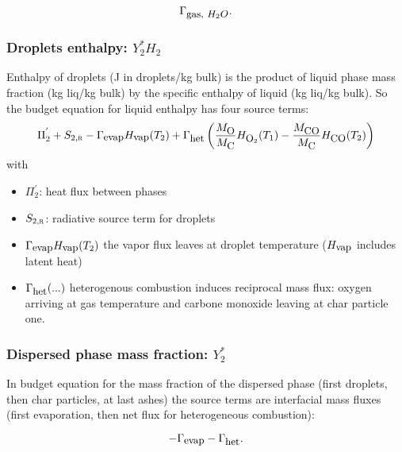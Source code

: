 \begin{equation}
   \Gamma_{\mbox{\small gas, $H_{2}O$}}.
\end{equation}                         

 



\subsubsection{Droplets enthalpy: $Y_{2}^{*}H_{2}$ }
 
Enthalpy of droplets (J in droplets/kg bulk) is the product of liquid phase mass
fraction (kg liq/kg bulk) by the specific enthalpy of liquid (kg liq/kg
bulk). So the budget equation for liquid enthalpy has four source terms:
\begin{equation}
     \Pi_{2}^{'}+S_{2,\mbox{\scriptsize\textsc{r}}}-\Gamma_{\mbox{\small evap}}H_{\mbox{\small vap}}(T_{2})
                        +\Gamma_{\mbox{\small het}}\left( \dfrac{M_{\mbox{\small O}}}{M_{\mbox{\small C}}}H_{\mbox{\small O}_{2}}(T_{1})
                                      -\dfrac{M_{\mbox{\small CO}   }}{M_{\mbox{\small C}}}H_{\mbox{\small CO}   }(T_{2})\right) 
\end{equation}
with
\begin{itemize}
\item $\Pi_{2}^{'}$: heat flux between phases
\item $S_{2,\mbox{\scriptsize\textsc{r}}}$: radiative source term for droplets
\item $\Gamma_{\mbox{\small evap}}H_{\mbox{\small vap}}(T_{2})$ the vapor flux leaves at droplet temperature ($H_{\mbox{\small vap}}$ includes latent heat)
\item $\Gamma_{\mbox{\small het}}(...)$ heterogenous combustion induces reciprocal mass flux: oxygen arriving at gas temperature and carbone monoxide leaving 
at char particle one.
\end{itemize}

\subsubsection{Dispersed phase mass fraction: $Y_{2}^{*}$}

In budget equation for the mass fraction of the dispersed phase (first droplets,
then char particles, at last ashes) the source terms are interfacial mass fluxes
(first evaporation, then net flux for heterogeneous combustion):

\begin{equation}
     -\Gamma_{\mbox{\small evap}}-\Gamma_{\mbox{\small het}} .
\end{equation}

\newpage


